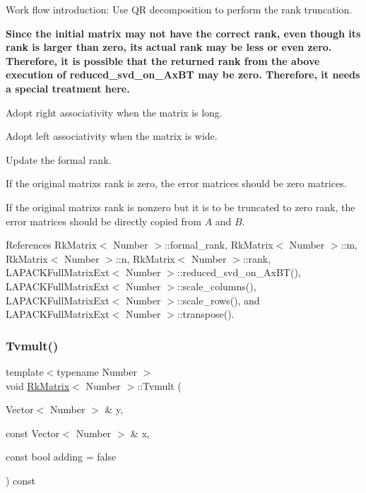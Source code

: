 Work flow introduction\+: Use QR decomposition to perform the rank truncation.

{\bfseries Since the initial matrix may not have the correct rank, even though its {\ttfamily rank} is larger than zero, its actual {\ttfamily rank} may be less or even zero. Therefore, it is possible that the returned {\ttfamily rank} from the above execution of {\ttfamily reduced\+\_\+svd\+\_\+on\+\_\+\+Ax\+BT} may be zero. Therefore, it needs a special treatment here.}

Adopt right associativity when the matrix is long.

Adopt left associativity when the matrix is wide.

Update the formal rank.

If the original matrix\textquotesingle{}s rank is zero, the error matrices should be zero matrices.

If the original matrix\textquotesingle{}s rank is nonzero but it is to be truncated to zero rank, the error matrices should be directly copied from $A$ and $B$.

References Rk\+Matrix$<$ Number $>$\+::formal\+\_\+rank, Rk\+Matrix$<$ Number $>$\+::m, Rk\+Matrix$<$ Number $>$\+::n, Rk\+Matrix$<$ Number $>$\+::rank, L\+A\+P\+A\+C\+K\+Full\+Matrix\+Ext$<$ Number $>$\+::reduced\+\_\+svd\+\_\+on\+\_\+\+Ax\+B\+T(), L\+A\+P\+A\+C\+K\+Full\+Matrix\+Ext$<$ Number $>$\+::scale\+\_\+columns(), L\+A\+P\+A\+C\+K\+Full\+Matrix\+Ext$<$ Number $>$\+::scale\+\_\+rows(), and L\+A\+P\+A\+C\+K\+Full\+Matrix\+Ext$<$ Number $>$\+::transpose().

\mbox{\label{classRkMatrix_a7162dd0c4580dbb5e98715d9b8dd56c1}} 
\subsubsection{\texorpdfstring{Tvmult()}{Tvmult()}}
{\footnotesize\ttfamily template$<$typename Number $>$ \\
void \hyperlink{classRkMatrix}{Rk\+Matrix}$<$ Number $>$\+::Tvmult (\begin{DoxyParamCaption}\item[{Vector$<$ Number $>$ \&}]{y,  }\item[{const Vector$<$ Number $>$ \&}]{x,  }\item[{const bool}]{adding = {\ttfamily false} }\end{DoxyParamCaption}) const}

